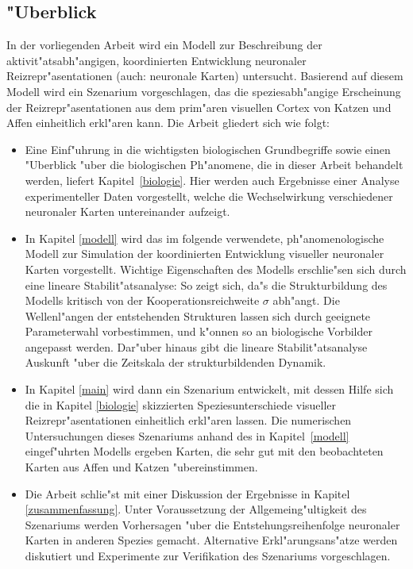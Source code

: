 \subsection{"Uberblick}

In der vorliegenden Arbeit wird ein Modell zur Beschreibung der
aktivit"atsabh"angigen, koordinierten Entwicklung neuronaler
Reizrepr"asentationen (auch: neuronale Karten) untersucht.  Basierend auf
diesem Modell wird ein Szenarium vorgeschlagen, das die speziesabh"angige
Erscheinung der Reizrepr"asentationen aus dem prim"aren visuellen Cortex
von Katzen und Affen einheitlich erkl"aren kann.  Die Arbeit gliedert sich
wie folgt:

\begin{itemize}
\item Eine Einf"uhrung in die wichtigsten biologischen Grundbegriffe sowie
einen "Uberblick "uber die biologischen Ph"anomene, die in dieser Arbeit
behandelt werden, liefert Kapitel~\ref{biologie}. Hier werden auch
Ergebnisse einer Analyse experimenteller Daten vorgestellt, welche die
Wechselwirkung verschiedener neuronaler Karten untereinander aufzeigt.

\item In Kapitel \ref{modell} wird das im folgende verwendete,
ph"anomenologische Modell zur Simulation der koordinierten Entwicklung
visueller neuronaler Karten vorgestellt. Wichtige Eigenschaften des Modells
erschlie"sen sich durch eine lineare Stabilit"atsanalyse: So zeigt sich,
da"s die Strukturbildung des Modells kritisch von der
Kooperationsreichweite $\sigma$ abh"angt.  Die Wellenl"angen der
entstehenden Strukturen lassen sich durch geeignete Parameterwahl
vorbestimmen, und k"onnen so an biologische Vorbilder angepasst werden.
Dar"uber hinaus gibt die lineare Stabilit"atsanalyse Auskunft "uber die
Zeitskala der strukturbildenden Dynamik.

\item In Kapitel \ref{main} wird dann ein Szenarium entwickelt, mit dessen
Hilfe sich die in Kapitel \ref{biologie} skizzierten Speziesunterschiede
visueller Reizrepr"asentationen einheitlich erkl"aren lassen.  Die
numerischen Untersuchungen dieses Szenariums anhand des in
Kapitel~\ref{modell} eingef"uhrten Modells ergeben Karten, die sehr gut mit
den beobachteten Karten aus Affen und Katzen "ubereinstimmen.

\item Die Arbeit schlie"st mit einer Diskussion der Ergebnisse in Kapitel
\ref{zusammenfassung}. Unter Voraussetzung der Allgemeing"ultigkeit des
Szenariums werden Vorhersagen "uber die Entstehungsreihenfolge neuronaler
Karten in anderen Spezies gemacht. Alternative Erkl"arungsans"atze werden
diskutiert und Experimente zur Verifikation des Szenariums vorgeschlagen.
\end{itemize}

